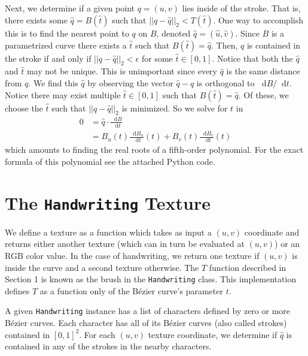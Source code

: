 \documentclass[12pt]{article}
\newcommand*\diff{\mathop{}\!\mathrm{d}}
\begin{document}
Next, we determine if a given point $q = (u,v)$ lies inside of the stroke. That is, there exists some $\hat{q} = B(\hat{t})$ such that $||q - \hat{q}||_2 < T(\hat{t})$. One way to accomplish this is to find the nearest point to $q$ on $B$, denoted $\hat{q} = (\hat{u}, \hat{v})$. Since $B$ is a parametrized curve there exists a $\hat{t}$ such that $B(\hat{t}) = \hat{q}$. Then, $q$ is contained in the stroke if and only if $||q - \hat{q}||_2 < \epsilon$ for some $\hat{t} \in [0,1]$. Notice that both the $\hat{q}$ and $\hat{t}$ may not be unique. This is unimportant since every $\hat{q}$ is the same distance from $q$. We find this $\hat{q}$ by observing the vector $\hat{q} - q$ is orthogonal to $\diff B / \diff t$. Notice there may exist multiple $\hat{t} \in [0,1]$ such that $B(\hat{t}) = \hat{q}$. Of these, we choose the $\hat{t}$ such that $||q - \hat{q}||_2$ is minimized. So we solve for $t$ in
\begin{align}
 0 &= \hat{q} \cdot \frac{\diff B}{\diff t} \nonumber \\
  &= B_u(t)\frac{\diff B_u}{\diff t}(t) + B_v(t)\frac{\diff B_v}{\diff t}(t) \label{poly}
\end{align}
which amounts to finding the real roots of a fifth-order polynomial. For the exact formula of this polynomial see the attached Python code.

\section{The \texttt{Handwriting} Texture}
We define a texture as a function which takes as input a $(u,v)$ coordinate and returns either another texture (which can in turn be evaluated at $(u,v)$) or an RGB color value. In the case of handwriting, we return one texture if $(u,v)$ is inside the curve and a second texture otherwise. The $T$ function described in Section 1 is known as the brush in the \texttt{Handwriting} class. This implementation defines $T$ as a function only of the B\'ezier curve's parameter $t$.

A given \texttt{Handwriting} instance has a list of characters defined by zero or more B\'ezier curves. Each character has all of its B\'ezier curves (also called strokes) contained in $[0,1]^2$. For each $(u,v)$ texture coordinate, we determine if $\hat{q}$ is contained in any of the strokes in the nearby characters.
\end{document}
